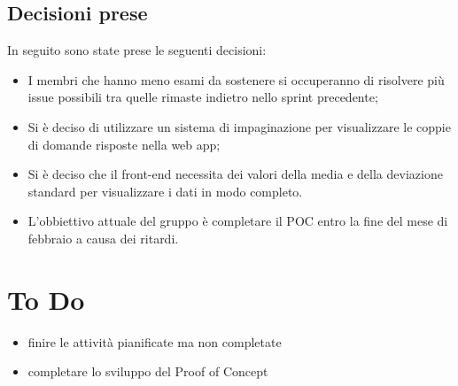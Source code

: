 \documentclass[a4paper, 12pt]{article}
\begin{document}
\subsection{Decisioni prese}
In seguito sono state prese le seguenti decisioni:
\begin{itemize}
    \item I membri che hanno meno esami da sostenere si occuperanno di risolvere più issue possibili tra quelle rimaste indietro nello sprint precedente;
    \item Si è deciso di utilizzare un sistema di impaginazione per visualizzare le coppie di domande risposte nella web app;
    \item Si è deciso che il front-end necessita dei valori della media e della deviazione standard per visualizzare i dati in modo completo.
    \item L'obbiettivo attuale del gruppo è completare il POC entro la fine del mese di febbraio a causa dei ritardi.
\end{itemize}

\section{To Do}
\begin{itemize}
    \item finire le attività pianificate ma non completate
    \item completare lo sviluppo del Proof of Concept
\end{itemize}
\end{document}
